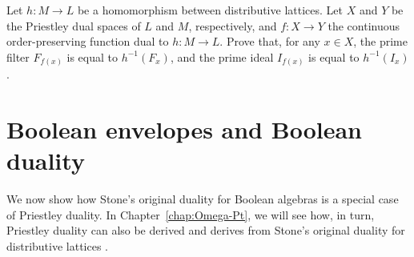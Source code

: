   
\exercise\label{exe:morphisms-concrete}
Let $h \colon M \to L$ be a homomorphism between distributive lattices. Let $X$ and $Y$ be the Priestley dual spaces of $L$ and $M$, respectively, and $f \colon X \to Y$ the continuous order-preserving function dual to $h \colon M \to L$.  Prove that, for any $x \in X$, the prime filter $F_{f(x)}$ is equal to $h^{-1}(F_x)$, and the prime ideal $I_{f(x)}$ is equal to $h^{-1}(I_x)$.


    

\section{Boolean envelopes and Boolean duality}\label{sec:boolenv-duality}
We now show how Stone's original duality for Boolean algebras \cite{Stone1936} is a special case of Priestley duality. In Chapter~\ref{chap:Omega-Pt}, we will see how, in turn, Priestley duality can also be derived and derives from Stone's original duality for distributive lattices \cite{Sto1937/38}.


